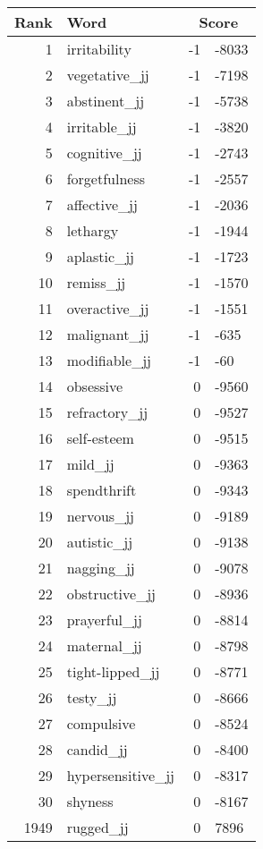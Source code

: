 \begin{longtable}[!htbp]{| rlr@{.}l |}
    \hline
    \textbf{Rank} & \textbf{Word} & \multicolumn{2}{c|}{\textbf{Score}} \\
    \hline
    \endhead
    1 & irritability & -1 & -8033 \\
    2 & vegetative\_jj & -1 & -7198 \\
    3 & abstinent\_jj & -1 & -5738 \\
    4 & irritable\_jj & -1 & -3820 \\
    5 & cognitive\_jj & -1 & -2743 \\
    6 & forgetfulness & -1 & -2557 \\
    7 & affective\_jj & -1 & -2036 \\
    8 & lethargy & -1 & -1944 \\
    9 & aplastic\_jj & -1 & -1723 \\
    10 & remiss\_jj & -1 & -1570 \\
    11 & overactive\_jj & -1 & -1551 \\
    12 & malignant\_jj & -1 & -635 \\
    13 & modifiable\_jj & -1 & -60 \\
    14 & obsessive & 0 & -9560 \\
    15 & refractory\_jj & 0 & -9527 \\
    16 & self-esteem & 0 & -9515 \\
    17 & mild\_jj & 0 & -9363 \\
    18 & spendthrift & 0 & -9343 \\
    19 & nervous\_jj & 0 & -9189 \\
    20 & autistic\_jj & 0 & -9138 \\
    21 & nagging\_jj & 0 & -9078 \\
    22 & obstructive\_jj & 0 & -8936 \\
    23 & prayerful\_jj & 0 & -8814 \\
    24 & maternal\_jj & 0 & -8798 \\
    25 & tight-lipped\_jj & 0 & -8771 \\
    26 & testy\_jj & 0 & -8666 \\
    27 & compulsive & 0 & -8524 \\
    28 & candid\_jj & 0 & -8400 \\
    29 & hypersensitive\_jj & 0 & -8317 \\
    30 & shyness & 0 & -8167 \\
    1949 & rugged\_jj & 0 & 7896 \\

\end{longtable}
